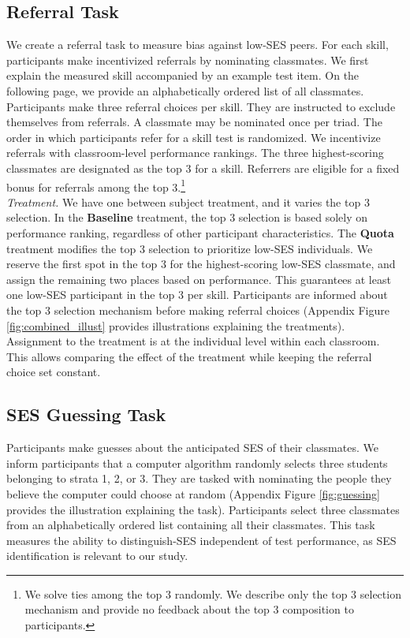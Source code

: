 \documentclass[11pt,a4paper,oneside]{article}
\begin{document}
\subsection{Referral Task} \label{referral_task}
We create a referral task to measure bias against low-SES peers.  For each skill, participants make incentivized referrals by nominating classmates. We first explain the measured skill accompanied by an example test item. On the following page, we provide an alphabetically ordered list of all  classmates. Participants make three referral choices per skill. They are instructed to exclude themselves from referrals. A classmate may be nominated once per triad. The order in which participants refer for a skill test is randomized. We incentivize referrals with classroom-level performance rankings. The three highest-scoring classmates are designated as the top 3 for a skill. Referrers are eligible for a fixed bonus for referrals among the top 3.\footnote{We solve ties among the top 3 randomly. We describe only the top 3 selection mechanism and provide no feedback about the top 3 composition to participants.}   \medskip\\
\textit{Treatment.} We have one between subject treatment, and it varies the top 3 selection. In the \textbf{Baseline} treatment, the top 3 selection is based solely on performance ranking, regardless of other participant characteristics. The \textbf{Quota} treatment modifies the top 3 selection to prioritize low-SES individuals. We reserve the first spot in the top 3 for the highest-scoring low-SES classmate, and assign the remaining two places based on performance. This guarantees at least one low-SES participant in the top 3 per skill. Participants are informed about the top 3 selection mechanism before making referral choices (Appendix Figure \ref{fig:combined_illust} provides illustrations explaining the treatments). Assignment to the treatment is at the individual level within each classroom. This allows comparing the effect of the treatment while keeping the referral choice set constant.

\subsection{SES Guessing Task}\label{guessing_task}
Participants make guesses about the anticipated SES of their classmates. We inform participants that a computer algorithm randomly selects three students belonging to strata 1, 2, or 3. They are tasked with nominating the people they believe the computer could choose at random (Appendix Figure \ref{fig:guessing} provides the illustration explaining the task). Participants select three classmates from an alphabetically ordered list containing all their classmates. This task measures the ability to distinguish-SES independent of test performance, as SES identification is relevant to our study. 
\end{document}

